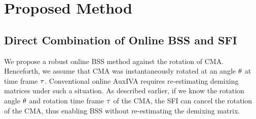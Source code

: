 \documentclass[sip,biber]{now-journal}
\begin{document}
\section{Proposed Method}\label{sec:proposed}

\subsection{Direct Combination of Online BSS and SFI}

We propose a robust online BSS method against the rotation of CMA.
Henceforth, we assume that CMA was instantaneously rotated at an angle $\theta$ at time frame $\tau$.
Conventional online AuxIVA requires re-estimating demixing matrices under such a situation.
As described earlier, if we know the rotation angle $\theta$ and rotation time frame $\tau$ of the CMA, the SFI can cancel the rotation of the CMA, thus enabling BSS without re-estimating the demixing matrix.
\end{document}
